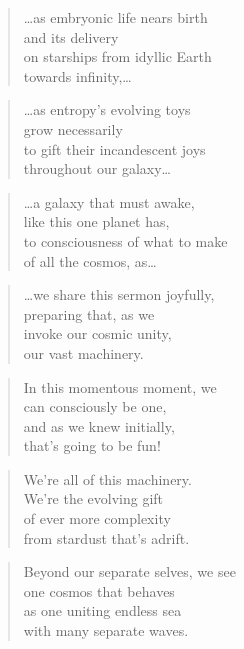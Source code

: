 \documentclass[10pt,a4paper]{article}
\begin{document}
\begin{multicols}{2}
\begin{verse}
…as embryonic life nears birth\\
and its delivery\\
on starships from idyllic Earth\\
towards infinity,…
\end{verse}

\begin{verse}
…as entropy’s evolving toys\\
grow necessarily\\
to gift their incandescent joys\\
throughout our galaxy…
\end{verse}

\begin{verse}
…a galaxy that must awake,\\
like this one planet has,\\
to consciousness of what to make\\
of all the cosmos, as…
\end{verse}

\begin{verse}
…we share this sermon joyfully,\\
preparing that, as we\\
invoke our cosmic unity,\\
our vast machinery.
\end{verse}

\begin{verse}
In this momentous moment, we\\
can consciously be one,\\
and as we knew initially,\\
that’s going to be fun!
\end{verse}

\begin{verse}
We’re all of this machinery.\\
We’re the evolving gift\\
of ever more complexity\\
from stardust that’s adrift.
\end{verse}

\begin{verse}
Beyond our separate selves, we see\\
one cosmos that behaves\\
as one uniting endless sea\\
with many separate waves.
\end{verse}


\end{multicols}
\end{document}
